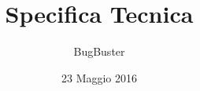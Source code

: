 



\title{\textbf{Specifica Tecnica}}
\author{BugBuster}

\date{23 Maggio 2016}




\makeFrontPage

\tableofcontents
\listoffigures
\listoftables





